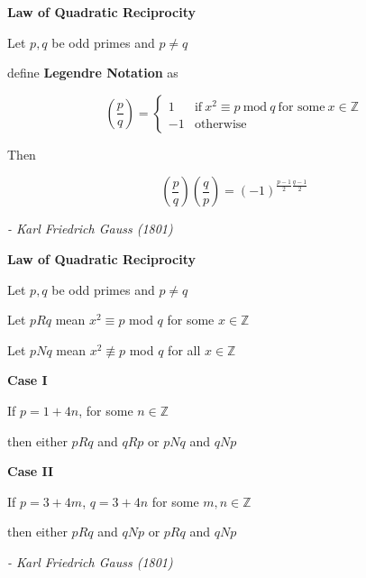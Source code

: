 \documentclass[17pt]{memoir}
\begin{document}
\Large

\begin{center}
  \textbf{Law of Quadratic Reciprocity}
\end{center}

Let $p, q$ be odd primes and $p \neq q$

define \textbf{Legendre Notation} as

\[
\left( \frac{p}{q} \right) =
  \begin{cases}
    1 & \text{if}\ x^2 \equiv p\ \text{mod}\ q\ \text{for some}\ x \in \mathbb{Z} \\
    -1 & \text{otherwise}
  \end{cases}
\]

Then

\[
\left( \frac{p}{q} \right) \left( \frac{q}{p} \right)
= (-1)^{\frac{p-1}{2}\frac{q-1}{2}}
\]

\bigskip
\begin{flushright}
  \textit{- Karl Friedrich Gauss (1801)}
\end{flushright}

\newpage


\begin{center}
  \textbf{Law of Quadratic Reciprocity}
\end{center}

Let $p, q$ be odd primes and $p \neq q$

Let $pRq$ mean $x^2 \equiv p$ mod $q$ for some $x \in \mathbb{Z}$

Let $pNq$ mean $x^2 \not\equiv p$ mod $q$ for all $x \in \mathbb{Z}$

\medskip
\textbf{Case I}

If $p = 1 + 4n$, for some $n \in \mathbb{Z}$

then either $pRq$ and $qRp$ or $pNq$ and $qNp$

\medskip
\textbf{Case II}

If $p = 3 + 4m$, $q = 3 + 4n$ for some $m,n \in \mathbb{Z}$

then either $pRq$ and $qNp$ or $pRq$ and $qNp$

\bigskip
\begin{flushright}
  \textit{- Karl Friedrich Gauss (1801)}
\end{flushright}
\end{document}
